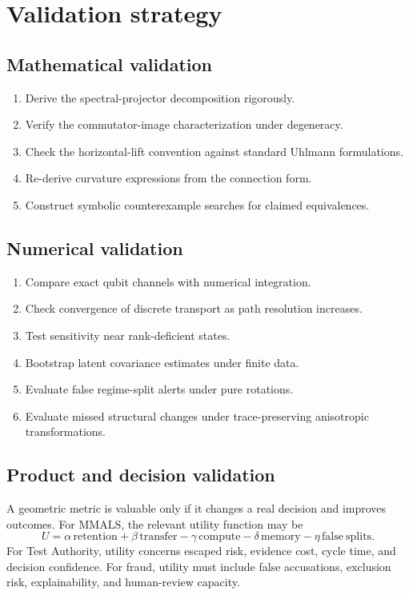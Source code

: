 \section{Validation strategy}

\subsection{Mathematical validation}

\begin{enumerate}
  \item Derive the spectral-projector decomposition rigorously.
  \item Verify the commutator-image characterization under degeneracy.
  \item Check the horizontal-lift convention against standard Uhlmann formulations.
  \item Re-derive curvature expressions from the connection form.
  \item Construct symbolic counterexample searches for claimed equivalences.
\end{enumerate}

\subsection{Numerical validation}

\begin{enumerate}
  \item Compare exact qubit channels with numerical integration.
  \item Check convergence of discrete transport as path resolution increases.
  \item Test sensitivity near rank-deficient states.
  \item Bootstrap latent covariance estimates under finite data.
  \item Evaluate false regime-split alerts under pure rotations.
  \item Evaluate missed structural changes under trace-preserving anisotropic transformations.
\end{enumerate}

\subsection{Product and decision validation}

A geometric metric is valuable only if it changes a real decision and improves outcomes. For MMALS, the relevant utility function may be
\[
U=\alpha\,\mathrm{retention}+\beta\,\mathrm{transfer}-\gamma\,\mathrm{compute}-\delta\,\mathrm{memory}-\eta\,\mathrm{false\ splits}.
\]
For Test Authority, utility concerns escaped risk, evidence cost, cycle time, and decision confidence. For fraud, utility must include false accusations, exclusion risk, explainability, and human-review capacity.


